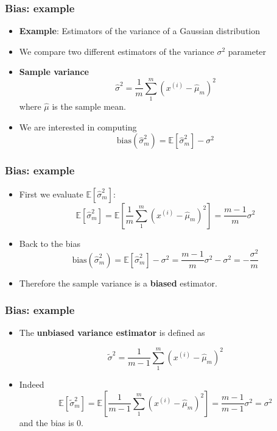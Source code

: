 \documentclass[notes]{beamer}          %
\newcommand{\field}[1]{\mathbb{#1}}
\begin{document}
\begin{frame}
\frametitle{Bias: example}
    \begin{itemize}
        \item {\bf Example}: Estimators of the variance of a Gaussian distribution
        \item We compare two different estimators of the variance $\sigma^2$ parameter
        \item {\bf Sample variance}
        $$
        \hat{\sigma}^2 = \frac{1}{m}\sum_{1}^{m} \left (  x^{(i)} - \hat{\mu}_m \right )^2
        $$
        where $\hat{\mu}$ is the sample mean.
        \item We are interested in computing
        $$
        \mbox{bias}(\hat{\sigma}^2_m) = \field{E} [\hat{\sigma}^2_m] - \sigma^2
        $$
    \end{itemize}
\end{frame}


\begin{frame}
\frametitle{Bias: example}
\begin{itemize}
    \item First we evaluate $\field{E} [\hat{\sigma}^2_m]$:
    $$
    \field E [\hat{\sigma}^2_m] = \field{E} \left [ \frac{1}{m}\sum_{1}^{m} \left (  x^{(i)} - \hat{\mu}_m \right )^2 \right ] = \frac{m-1}{m} \sigma^2
    $$
    \item Back to the bias
    $$
    \mbox{bias}(\hat{\sigma}^2_m) = \field{E} [\hat{\sigma}^2_m] - \sigma^2  = \frac{m-1}{m} \sigma^2 - \sigma^2 = -\frac{\sigma^2}{m}
    $$
    \item Therefore the sample variance is a \textbf{biased} estimator.
\end{itemize}
\end{frame}


\begin{frame}
\frametitle{Bias: example}
\begin{itemize}
    \item The {\bf unbiased variance estimator} is defined as


    $$
        \tilde{\sigma}^2 = \frac{1}{m - 1}\sum_{1}^{m} \left (  x^{(i)} - \hat{\mu}_m \right )^2
    $$
    \item Indeed
    $$
    \field E [\tilde{\sigma}^2_m] = \field{E} \left [ \frac{1}{m-1}\sum_{1}^{m} \left (  x^{(i)} - \hat{\mu}_m \right )^2 \right ] = \frac{m-1}{m-1} \sigma^2 = \sigma^2
    $$
    and the bias is $0$. \\
\end{itemize}
\end{frame}
\end{document}
